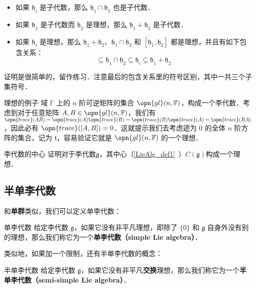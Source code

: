 \begin{itemize}
\item 如果 $\mathfrak{h}_i$ 是子代数，那么 $\mathfrak{h}_1\cap\mathfrak{h}_2$ 也是子代数．
\item 如果 $\mathfrak{h}_1$ 是子代数而 $\mathfrak{h}_2$ 是理想，那么 $\mathfrak{h}_1+\mathfrak{h}_2$ 是子代数．
\item 如果 $\mathfrak{h}_i$ 是理想，那么 $\mathfrak{h}_1+\mathfrak{h}_2$、$\mathfrak{h}_1\cap\mathfrak{h}_2$ 和 $[\mathfrak{h}_1, \mathfrak{h}_2]$ 都是理想，并且有如下包含关系：\begin{equation}
[\mathfrak{h}_1, \mathfrak{h}_2]\subseteq\mathfrak{h}_1\cap\mathfrak{h}_2\subseteq\mathfrak{h}_i\subseteq\mathfrak{h}_1+\mathfrak{h}_2
\end{equation}

\end{itemize}

证明是很简单的，留作练习．注意最后的包含关系里的符号区别，其中一共三个子集符号．

\begin{example}{理想的例子}
域 $\mathbb{F}$ 上的 $n$ 阶可逆矩阵的集合 $\opn{gl}(n, \mathbb{F})$，构成一个李代数．考虑到对于任意矩阵 $A, B\in\opn{gl}(n, \mathbb{F})$，我们有 $\opn{trace}(AB)=\opn{trace}(A)\opn{trace}(B)=\opn{trace}(B)\opn{trace}(A)=\opn{trace}(BA)$，因此必有 $\opn{trace}([A, B])=0$．这就提示我们去考虑迹为 $0$ 的全体 $n$ 阶方阵的集合，记为 $\mathfrak{t}$，容易验证它就是 $\opn{gl}(n, \mathbb{F})$ 的一个理想．
\end{example}

\begin{exercise}{李代数的中心}
证明对于李代数$\mathfrak{g}$，其中心（\autoref{LieAlg_def1}~）$C(\mathfrak{g})$构成一个理想．
\end{exercise}


\subsection{半单李代数}

和\textbf{单群}类似，我们可以定义单李代数：

\begin{definition}{单李代数}
给定李代数 $\mathfrak{g}$，如果它没有非平凡理想，即除了 $\{0\}$ 和 $\mathfrak{g}$ 自身外没有别的理想，那么我们称它为一个\textbf{单李代数（simple Lie algebra）}．
\end{definition}

类似地，如果加一个限制，还有半单李代数的概念：
\begin{definition}{半单李代数}
给定李代数 $\mathfrak{g}$，如果它没有非平凡\textbf{交换}理想，那么我们称它为一个\textbf{半单李代数（semi-simple Lie algebra）}．
\end{definition}





